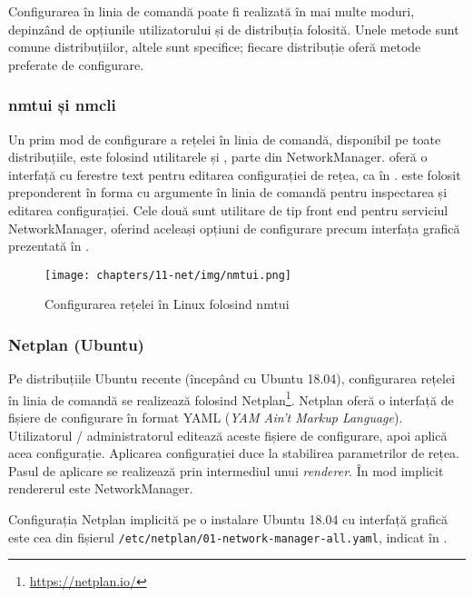Configurarea în linia de comandă poate fi realizată în mai multe moduri, depinzând de opțiunile utilizatorului și de distribuția folosită.
Unele metode sunt comune distribuțiilor, altele sunt specifice; fiecare distribuție oferă metode preferate de configurare.

\subsubsection{nmtui și nmcli}
\label{sec:net:linux-config:cli:nm}

Un prim mod de configurare a rețelei în linia de comandă, disponibil pe toate distribuțiile, este folosind utilitarele  și , parte din NetworkManager.
 oferă o interfață cu ferestre text pentru editarea configurației de rețea, ca în .
 este folosit preponderent în forma cu argumente în linia de comandă pentru inspectarea și editarea configurației.
Cele două sunt utilitare de tip front end pentru serviciul NetworkManager, oferind aceleași opțiuni de configurare precum interfața grafică prezentată în .

\begin{figure}[!htbp]
  \centering
  \texttt{[image: chapters/11-net/img/nmtui.png]}
  \caption{Configurarea rețelei în Linux folosind nmtui}
  \label{fig:net:nmtui}
\end{figure}

\subsubsection{Netplan (Ubuntu)}
\label{sec:net:linux-config:cli:netplan}

Pe distribuțiile Ubuntu recente (începând cu Ubuntu 18.04), configurarea rețelei în linia de comandă se realizează folosind Netplan\footnote{\url{https://netplan.io/}}.
Netplan oferă o interfață de fișiere de configurare în format YAML (\textit{YAM Ain't Markup Language}).
Utilizatorul / administratorul editează aceste fișiere de configurare, apoi aplică acea configurație.
Aplicarea configurației duce la stabilirea parametrilor de rețea.
Pasul de aplicare se realizează prin intermediul unui \textit{renderer}.
În mod implicit rendererul este NetworkManager.

Configurația Netplan implicită pe o instalare Ubuntu 18.04 cu interfață grafică este cea din fișierul \texttt{/etc/netplan/01-network-manager-all.yaml}, indicat în .

